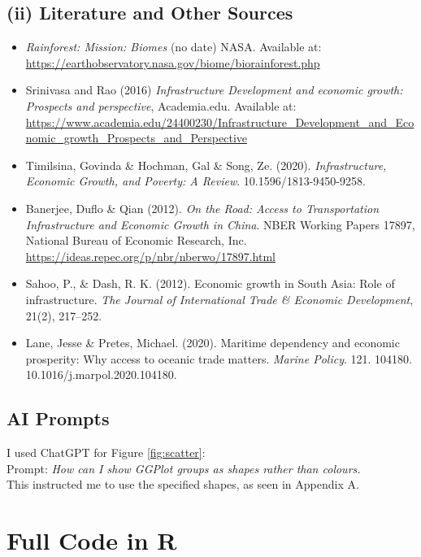 \documentclass[12pt,a4paper]{article}
\begin{document}
\subsection*{(ii) Literature and Other Sources}

\begin{itemize}[leftmargin=2em]
  \item \textit{Rainforest: Mission: Biomes} (no date) NASA. Available at: \url{https://earthobservatory.nasa.gov/biome/biorainforest.php}
  \item Srinivasa and Rao (2016) \textit{Infrastructure Development and economic growth: Prospects and perspective}, Academia.edu. Available at: \url{https://www.academia.edu/24400230/Infrastructure_Development_and_Economic_growth_Prospects_and_Perspective}
  \item Timilsina, Govinda \& Hochman, Gal \& Song, Ze. (2020). \textit{Infrastructure, Economic Growth, and Poverty: A Review}. 10.1596/1813-9450-9258.
  \item Banerjee, Duflo \& Qian (2012). \textit{On the Road: Access to Transportation Infrastructure and Economic Growth in China}. NBER Working Papers 17897, National Bureau of Economic Research, Inc. \url{https://ideas.repec.org/p/nbr/nberwo/17897.html}
  \item Sahoo, P., \& Dash, R. K. (2012). Economic growth in South Asia: Role of infrastructure. \textit{The Journal of International Trade \& Economic Development}, 21(2), 217--252.
  \item Lane, Jesse \& Pretes, Michael. (2020). Maritime dependency and economic prosperity: Why access to oceanic trade matters. \textit{Marine Policy}. 121. 104180. 10.1016/j.marpol.2020.104180.
\end{itemize}

\subsection*{AI Prompts}

I used ChatGPT for Figure \ref{fig:scatter}:\\
Prompt: \textit{How can I show GGPlot groups as shapes rather than colours.}\\
This instructed me to use the specified shapes, as seen in Appendix A.

\appendix

\section{Full Code in R}


\end{document}
